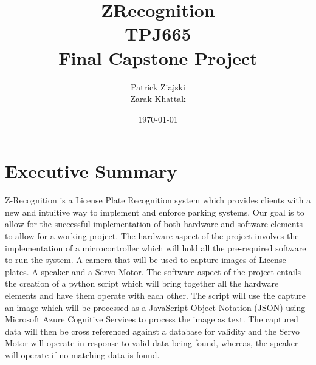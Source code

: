 \documentclass[a4paper,12pt]{article}
\title{ZRecognition \\ TPJ665 \\ Final Capstone Project}
\author{Patrick Ziajski \\ Zarak Khattak}
\date{\today}
\begin{document}
\maketitle
\thispagestyle{empty}

\newpage
\tableofcontents
\newpage
\listoffigures
\listoftables


\newpage
{}
\section{Executive Summary}
Z-Recognition is a License Plate Recognition system which provides clients with a new and intuitive way to implement and enforce parking systems. Our goal is to allow for the successful implementation of both hardware and software elements to allow for a working project.
The hardware aspect of the project involves the implementation of a microcontroller which will hold all the pre-required software to run the system. A camera that will be used to capture images of License plates. A speaker and a Servo Motor. 
The software aspect of the project entails the creation of a python script which will bring together all the hardware elements and have them operate with each other. The script will use the capture an image which will be processed as a JavaScript Object Notation (JSON) using Microsoft Azure Cognitive Services to process the image as text. The captured data will then be cross referenced against a database for validity and the Servo Motor will operate in response to valid data being found, whereas, the speaker will operate if no matching data is found.


\end{document}
